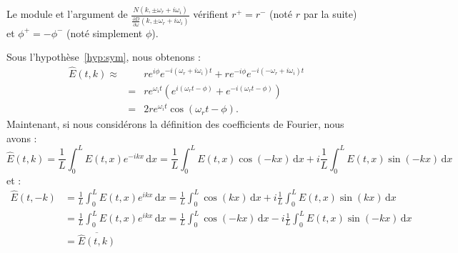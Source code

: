 \begin{hyp}
  Le module et l'argument de $\frac{N(k,\pm\omega_r+i\omega_i)}{\frac{\partial D}{\partial \omega}(k,\pm\omega_r+i\omega_i)}$  vérifient $r^+ = r^-$ (noté $r$ par la suite) et $\phi^+ = -\phi^-$ (noté simplement $\phi$).
  \label{hyp:sym}
\end{hyp}
Sous l'hypothèse~\ref{hyp:sym}, nous obtenons :
\begin{eqnarray}
  \hat{E}(t,k)\approx&& re^{i\phi}e^{-i(\omega_r+i\omega_i)t}+re^{-i\phi}e^{-i(-\omega_r+i\omega_i)t} \nonumber\\
  &=&re^{\omega_i t}\left(e^{i(\omega_r t-\phi)}+e^{-i(\omega_r t-\phi)}\right)\nonumber\\
  &=&2re^{\omega_i t}\cos\left(\omega_r t-\phi\right).
  \label{eq:Etk}
\end{eqnarray}
Maintenant, si nous considérons la définition des coefficients de Fourier, nous avons :
$$
  \hat{E}(t,k) = \frac{1}{L}\int_0^L E(t,x)e^{-ikx}\,\mathrm{d}x = \frac{1}{L}\int_0^L E(t,x)\cos(-kx)\,\mathrm{d}x + i\frac{1}{L}\int_0^L E(t,x)\sin(-kx)\,\mathrm{d}x
$$
et :
$$
  \begin{aligned}
    \hat{E}(t,-k) 
      & = \frac{1}{L}\int_0^L E(t,x)e^{ikx}\,\mathrm{d}x = \frac{1}{L}\int_0^L\cos(kx)\,\mathrm{d}x + i\frac{1}{L}\int_0^L E(t,x)\sin(kx)\,\mathrm{d}x \\
      & = \frac{1}{L}\int_0^L E(t,x)e^{ikx}\,\mathrm{d}x = \frac{1}{L}\int_0^L\cos(-kx)\,\mathrm{d}x - i\frac{1}{L}\int_0^L E(t,x)\sin(-kx)\,\mathrm{d}x \\
      & = \overline{\hat{E}(t,k)}
  \end{aligned}
$$

